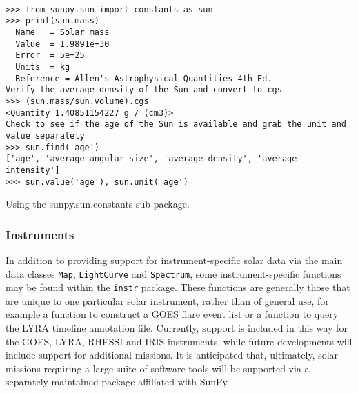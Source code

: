 \begin{listing}[H]
\begin{verbatim}

>>> from sunpy.sun import constants as sun
>>> print(sun.mass)
  Name   = Solar mass
  Value  = 1.9891e+30
  Error  = 5e+25
  Units  = kg
  Reference = Allen's Astrophysical Quantities 4th Ed.
Verify the average density of the Sun and convert to cgs
>>> (sun.mass/sun.volume).cgs
<Quantity 1.40851154227 g / (cm3)>
Check to see if the age of the Sun is available and grab the unit and value separately
>>> sun.find('age')
['age', 'average angular size', 'average density', 'average intensity']
>>> sun.value('age'), sun.unit('age')

\end{verbatim}
\caption{Using the sunpy.sun.constants sub-package.}
\label{code:constants_code}
\end{listing}
	
\subsubsection{Instruments}
In addition to providing support for instrument-specific solar data via the main data classes \texttt{Map}, \texttt{LightCurve} and \texttt{Spectrum}, some instrument-specific functions may be found within the \texttt{instr} package. These functions are generally those that are unique to one particular solar instrument, rather than of general use, for example a function to construct a GOES flare event list or a function to query the LYRA timeline annotation file. Currently, support is included in this way for the GOES, LYRA, RHESSI and IRIS instruments, while future developments will include support for additional missions. It is anticipated that, ultimately, solar missions requiring a large suite of software tools will be supported via a separately maintained package affiliated with SunPy.


